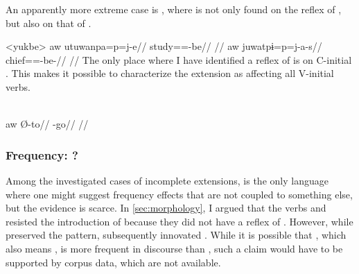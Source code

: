 An apparently more extreme case is \yukpa, where  is not only found on the reflex of  , but also on that of  .

\pex<yukbe>\yukpa \parencite[][142, 143]{meira2006syntactic}
\begingl
\gla aw utuwanpa=p=j-e//
\glb {} study==-be//
\glft {}//
\endgl
{}
\begingl
\gla aw juwatpɨ=p=j-a-s//
\glb {} chief==-be-//
\glft {}//
\endgl
\xe
%
The only place where I have identified a reflex of  is on C-initial  .
This makes it possible to characterize the extension as affecting all V-initial verbs.

\yukpa \parencite[][139]{meira2006syntactic}\\
\begingl
\gla aw Ø-to//
\glb {} -go//
\glft {}//
\endgl
\xe


\subsubsection{Frequency: \bakairi?}
\label{sec:frequency}
Among the investigated cases of incomplete extensions, \bakairi is the only language where one might suggest frequency effects that are not coupled to something else, but the evidence is scarce.
In \cref{sec:morphology}, I argued that the \PPek verbs   and   resisted the introduction of  because they did not have a reflex of \detrz.
However, while \bakairi {}  preserved the \PPek pattern,   subsequently innovated .
While it is possible that , which also means  \parencite[105]{von1892bakairi}, is more frequent in \bakairi discourse than , such a claim would have to be supported by corpus data, which are not available.

